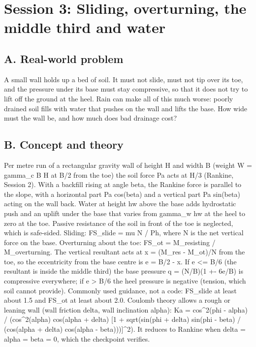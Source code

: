 \documentclass[11pt,a4paper]{article}
\begin{document}
\section{Session 3: Sliding, overturning, the middle third and water}

\subsection*{A. Real-world problem}
A small wall holds up a bed of soil. It must not slide, must not tip over its toe, and the pressure under its base must stay compressive, so that it does not try to lift off the ground at the heel. Rain can make all of this much worse: poorly drained soil fills with water that pushes on the wall and lifts the base. How wide must the wall be, and how much does bad drainage cost?

\subsection*{B. Concept and theory}
Per metre run of a rectangular gravity wall of height H and width B (weight W = gamma\_c B H at B/2 from the toe) the soil force Pa acts at H/3 (Rankine, Session 2). With a backfill rising at angle beta, the Rankine force is parallel to the slope, with a horizontal part Pa cos(beta) and a vertical part Pa sin(beta) acting on the wall back. Water at height hw above the base adds hydrostatic push and an uplift under the base that varies from gamma\_w hw at the heel to zero at the toe. Passive resistance of the soil in front of the toe is neglected, which is safe-sided. Sliding: FS\_slide = mu N / Ph, where N is the net vertical force on the base. Overturning about the toe: FS\_ot = M\_resisting / M\_overturning. The vertical resultant acts at x = (M\_res - M\_ot)/N from the toe, so the eccentricity from the base centre is e = B/2 - x. If e \textless{}= B/6 (the resultant is inside the middle third) the base pressure q = (N/B)(1 +- 6e/B) is compressive everywhere; if e \textgreater{} B/6 the heel pressure is negative (tension, which soil cannot provide). Commonly used guidance, not a code: FS\_slide at least about 1.5 and FS\_ot at least about 2.0. Coulomb theory allows a rough or leaning wall (wall friction delta, wall inclination alpha): Ka = cos\textasciicircum{}2(phi - alpha) / (cos\textasciicircum{}2(alpha) cos(alpha + delta) [1 + sqrt(sin(phi + delta) sin(phi - beta) / (cos(alpha + delta) cos(alpha - beta)))]\textasciicircum{}2). It reduces to Rankine when delta = alpha = beta = 0, which the checkpoint verifies.
\end{document}
